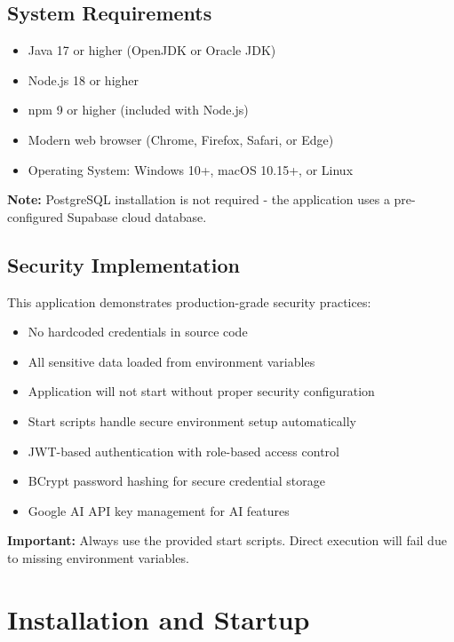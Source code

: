 \documentclass[11pt,a4paper]{article}
\begin{document}
\subsection{System Requirements}

\begin{itemize}[leftmargin=*]
    \item Java 17 or higher (OpenJDK or Oracle JDK)
    \item Node.js 18 or higher
    \item npm 9 or higher (included with Node.js)
    \item Modern web browser (Chrome, Firefox, Safari, or Edge)
    \item Operating System: Windows 10+, macOS 10.15+, or Linux
\end{itemize}

\textbf{Note:} PostgreSQL installation is not required - the application uses a pre-configured Supabase cloud database.

\subsection{Security Implementation}

This application demonstrates production-grade security practices:

\begin{itemize}[leftmargin=*]
    \item No hardcoded credentials in source code
    \item All sensitive data loaded from environment variables
    \item Application will not start without proper security configuration
    \item Start scripts handle secure environment setup automatically
    \item JWT-based authentication with role-based access control
    \item BCrypt password hashing for secure credential storage
    \item Google AI API key management for AI features
\end{itemize}

\textbf{Important:} Always use the provided start scripts. Direct execution will fail due to missing environment variables.

\section{Installation and Startup}
\end{document}
